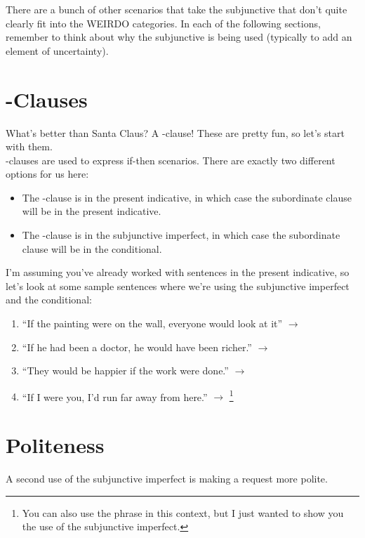 \label{sec:other}

There are a bunch of other scenarios that take the subjunctive that don't quite clearly fit into the WEIRDO categories. In each of the following sections, remember to think about why the subjunctive is being used (typically to add an element of uncertainty).

\section{-Clauses}

What's better than Santa Claus? A -clause! These are pretty fun, so let's start with them. \\

-clauses are used to express if-then scenarios. There are exactly two different options for us here:
\begin{itemize}[noitemsep]
	\item The -clause is in the present indicative, in which case the subordinate clause will be in the present indicative.
	\item The -clause is in the subjunctive imperfect, in which case the subordinate clause will be in the conditional. 
\end{itemize}

I'm assuming you've already worked with sentences in the present indicative, so let's look at some sample sentences where we're using the subjunctive imperfect and the conditional:
\begin{enumerate}[noitemsep]
	\item ``If the painting were on the wall, everyone would look at it'' $\rightarrow$ 
	\item ``If he had been a doctor, he would have been richer.'' $\rightarrow$ 
	\item ``They would be happier if the work were done.'' $\rightarrow$ 
	\item ``If I were you, I'd run far away from here.'' $\rightarrow$ \footnote{You can also use the phrase  in this context, but I just wanted to show you the use of the subjunctive imperfect.}
\end{enumerate}

\section{Politeness}
A second use of the subjunctive imperfect is making a request more polite. \\

